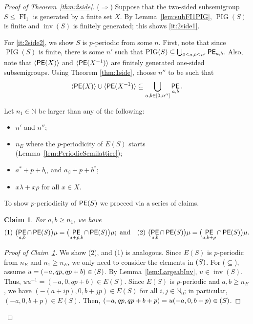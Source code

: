 \documentclass[reqno]{amsart}
\theoremstyle{plain}
\newtheorem{claim}{Claim}[lem]
\theoremstyle{definition}
\DeclareMathOperator{\inv}{inv}
\DeclareMathOperator{\PIG}{PIG}
\DeclareMathOperator{\FI}{FI}
\let\P\relax
\DeclareMathOperator{\P}{\textup{\textsf{P}}}
\DeclareMathOperator{\PE}{\textup{\textsf{PE}}}
\newenvironment{bulletmidsentence}{\begin{itemize}[topsep=0mm, leftmargin=8mm, itemsep=1mm]
}{\end{itemize}}
\numberwithin{equation}{section}
\begin{document}
\begin{proof}[Proof of Theorem~\ref{thm:2side}]
\noindent ($\Rightarrow$) Suppose that the two-sided subsemigroup $S\leq \FI_1$ is generated by a finite set $X$. By Lemma~\ref{lem:subFI1PIG}, $\PIG(S)$ is finite and $\inv(S)$ is finitely generated; this shows \ref{it:2side1}.

For \ref{it:2side2}, we show $S$ is $p$-periodic from some $n$. First, note that since $\PIG(S)$ is finite, there is some $n'$ such that $\PIG(S)\subseteq \bigcup_{0\leq a,b\leq n'}\PE_{a,b}$. Also, note that $\langle \PE(X)\rangle$ and $\langle\PE(X^{-1})\rangle$ are finitely generated one-sided subsemigroups. Using Theorem \ref{thm:1side}, choose $n''$ to be such that
\[
\langle\PE(X)\rangle\cup \langle\PE(X^{-1})\rangle\subseteq \bigcup_{a,b\in [0,n'']}\PE_{a,b}.
\]

Let $n_1\in\mathbb{N}$ be larger than any of the following:
\begin{bulletmidsentence}
    \item $n'$ and $n''$;
    \item $n_E$ where the $p$-periodicity of $E(S)$ starts (Lemma~\ref{lem:PeriodicSemilattice});
    \item $a^\ast + p +b_{\alpha}$ and $a_{\beta} + p + b^\ast$;
    \item $x\lambda + x\rho$ for all $x\in X$.
\end{bulletmidsentence}

To show $p$-periodicity of $\PE(S)$ we proceed via a series of claims.


\begin{claim}
\label{cl:2side1}
For $a,b\geq n_1$, we have 
\[
\textup{(1)}\ \bigl(\PE_{a,b}\cap \PE(S)\bigr)\mu = \bigl(\PE_{a+p, b}\cap \PE(S)\bigr)\mu; \text{ and}\quad
\textup{(2)}\ \bigl(\PE_{a,b}\cap \PE(S)\bigr) \mu = \bigl(\PE_{a,b+p}\cap \PE(S)\bigr)\mu .
\]
\end{claim}


\begin{proof}[Proof of Claim~\ref{cl:2side1}]
We show (2), and (1) is analogous. Since $E(S)$ is $p$-periodic from $n_E$ and ${n_1\geq n_E}$, we only need to consider the elements in $\P(S)$. For ($\subseteq$), assume $u=(-a, qp, qp+b)\in \P(S)$. By Lemma~\ref{lem:LargeabInv}, $u\in \inv(S)$. Thus, $uu^{-1} = (-a, 0, qp+b)\in E(S)$. Since $E(S)$ is $p$-periodic and $a,b\geq n_E$, we have $(-(a+ip), 0, b+jp)\in E(S)$ for all $i,j\in\mathbb{N}_0$; in particular, $(-a, 0, b+p)\in E(S)$. Then, $(-a, qp, qp+b+p) = u(-a, 0, b+p)\in \P(S)$.


\end{proof}
\end{proof}
\end{document}

